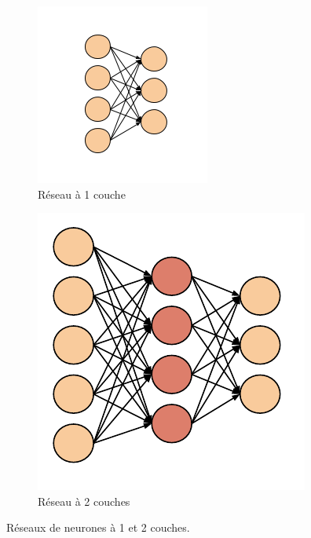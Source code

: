 \begin{figure}[!htb]
  \begin{subfigure}{0.49\textwidth}
		\includegraphics[width=\linewidth]{figures/Perceptron.png}
		\caption{Réseau à 1 couche} \label{fig:perceptron}
	\end{subfigure}
	\hspace*{\fill} %
	\begin{subfigure}{0.49\textwidth}
		\includegraphics[width=\linewidth]{figures/MLP.pdf}
		\caption{Réseau à 2 couches} \label{fig:mlp}
	\end{subfigure}
	\caption{Réseaux de neurones à 1 et 2 couches.}
\end{figure}

